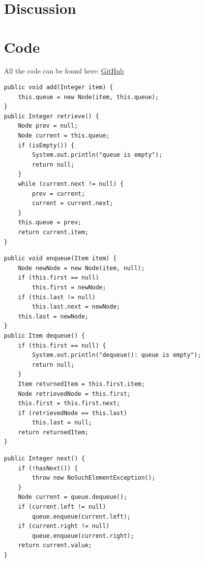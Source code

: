 \documentclass[a4paper,11pt]{article}
\newenvironment{code}{\captionsetup{type=listing}}{}
\begin{document}
\section{Discussion}


\newpage
\FloatBarrier
\section*{Code}
All the code can be found here: \href{https://github.com/adrian-jonsson-sjoedin/ID1021-AlgoData/tree/main/Tasks/Trees/src}{GitHub}

\begin{code}
    \label{code:queueNoLast}
    \begin{verbatim}
public void add(Integer item) {
    this.queue = new Node(item, this.queue);
}
public Integer retrieve() {
    Node prev = null;
    Node current = this.queue;
    if (isEmpty()) {
        System.out.println("queue is empty");
        return null;
    }
    while (current.next != null) {
        prev = current;
        current = current.next;
    }
    this.queue = prev;
    return current.item;
}
\end{verbatim}
\end{code}

\begin{code}
    \label{code:queue}
    \begin{verbatim}
public void enqueue(Item item) {
    Node newNode = new Node(item, null);
    if (this.first == null)
        this.first = newNode;
    if (this.last != null)
        this.last.next = newNode;
    this.last = newNode;
}
public Item dequeue() {
    if (this.first == null) {
        System.out.println("dequeue(): queue is empty");
        return null;
    }
    Item returnedItem = this.first.item;
    Node retrievedNode = this.first;
    this.first = this.first.next;
    if (retrievedNode == this.last)
        this.last = null;
    return returnedItem;
}
\end{verbatim}
\end{code}

\begin{code}
    \label{code:iterator}
    \begin{verbatim}
public Integer next() {
    if (!hasNext()) {
        throw new NoSuchElementException();
    }
    Node current = queue.dequeue();
    if (current.left != null)
        queue.enqueue(current.left);
    if (current.right != null)
        queue.enqueue(current.right);
    return current.value;
}
\end{verbatim}
\end{code}
\end{document}
